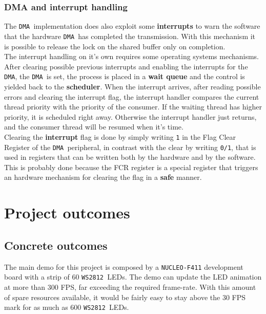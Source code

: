 \documentclass[10pt,a4]{article}
\newcommand{\ws}{\texttt{WS2812 }}
\newcommand{\dma}{\texttt{DMA }}
\begin{document}
\subsubsection{DMA and interrupt handling}
The \dma implementation does also exploit some \textbf{interrupts} to warn the software that the hardware \dma has completed the transmission. With this mechanism it is possible to release the lock on the shared buffer only on completion.\\

The interrupt handling on it's own requires some operating systems mechanisms. After clearing possible previous interrupts and enabling the interrupts for the \texttt{DMA}, the \dma is set, the process is placed in a \textbf{wait queue} and the control is yielded back to the \textbf{scheduler}. When the interrupt arrives, after reading possible errors and clearing the interrupt flag, the interrupt handler compares the current thread priority with the priority of the consumer. If the waiting thread has higher priority, it is scheduled right away. Otherwise the interrupt handler just returns, and the consumer thread will be resumed when it's time.\\

Clearing the \textbf{interrupt} flag is done by simply writing \texttt{1} in the Flag Clear Register of the \dma peripheral, in contrast with the clear by writing \texttt{0/1}, that is used in registers that can be written both by the hardware and by the software. This is probably done because the FCR register is a special register that triggers an hardware mechanism for clearing the flag in a \textbf{safe} manner.

\clearpage

\section{Project outcomes}

\subsection{Concrete outcomes}
The main demo for this project is composed by a \texttt{NUCLEO-F411} development board with a strip of 60 \ws LEDs. The demo can update the LED animation at more than 300 FPS, far exceeding the required frame-rate. With this amount of spare resources available, it would be fairly easy to stay above the 30 FPS mark for as much as 600 \ws LEDs.
\end{document}
